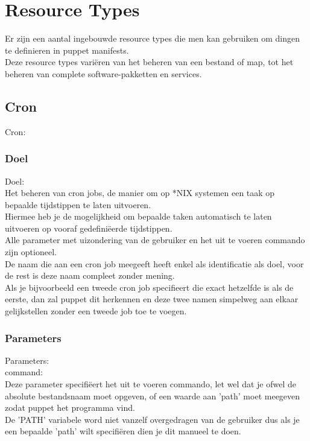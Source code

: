 \chapter{Resource Types}

Er zijn een aantal ingebouwde resource types die men kan gebruiken om dingen te definieren in puppet manifests.\\
Deze resource types variëren van het beheren van een bestand of map, tot het beheren van complete software-pakketten en services.\\


\section{Cron}
Cron:\\
\subsection{Doel}
Doel:\\
	Het beheren van cron jobs, de manier om op *NIX systemen een taak op bepaalde tijdstippen te laten uitvoeren.\\
	Hiermee heb je de mogelijkheid om bepaalde taken automatisch te laten uitvoeren op vooraf gedefiniëerde tijdstippen.\\
	Alle parameter met uizondering van de gebruiker en het uit te voeren commando zijn optioneel.\\

	De naam die aan een cron job meegeeft heeft enkel als identificatie als doel, voor de rest is deze naam compleet zonder mening.\\
	Als je bijvoorbeeld een tweede cron job specifieert die exact hetzelfde is als de eerste, dan zal puppet dit herkennen en deze twee namen simpelweg aan elkaar gelijkstellen zonder een tweede job toe te voegen.\\



\subsection{Parameters}
Parameters:\\

		command:\\
		Deze parameter specifiëert het uit te voeren commando, let wel dat je ofwel de absolute bestandsnaam moet opgeven, of een waarde aan 'path' moet meegeven zodat puppet het programma vind.\\
		De 'PATH' variabele word niet vanzelf overgedragen van de gebruiker dus als je een bepaalde 'path' wilt specifiëren dien je dit manueel te doen.\\

